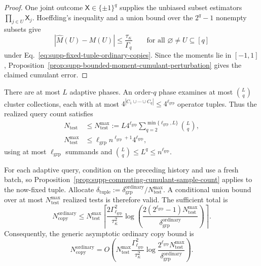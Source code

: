 \documentclass[
  aps,
  prx,
  reprint,
  superscriptaddress,
  amsmath,
  amssymb,
  nofootinbib,
  longbibliography
]{revtex4-2}
\begin{document}
\begin{proof}
One joint outcome $\mathsf X\in\{\pm1\}^q$ supplies the unbiased subset
estimators $\prod_{j\in U}\mathsf X_j$.  Hoeffding's inequality
\cite{Hoeffding1963} and a union bound over the $2^q-1$ nonempty subsets give
\begin{equation}
|\widehat M(U)-M(U)|
\le
\frac{\tau_\kappa}{\Gamma_q}
\qquad
\text{for all }\varnothing\ne U\subseteq[q]
\end{equation}
under Eq.~\eqref{eq:supp-fixed-tuple-ordinary-copies}.  Since the moments lie
in $[-1,1]$,
Proposition~\ref{prop:supp-bounded-moment-cumulant-perturbation} gives the
claimed cumulant error.
\end{proof}

There are at most $L$ adaptive phases.  An order-$q$ phase examines at most
$\binom Lq$ cluster collections, each with at most
$4^{|C_1\cup\cdots\cup C_q|}\le4^{\ell_{\mathrm{grp}}}$ operator tuples.
Thus the realized query count satisfies
\begin{align}
N_{\mathrm{test}}
&\le N_{\mathrm{test}}^{\max}
:=
L4^{\ell_{\mathrm{grp}}}
\sum_{q=2}^{\min\{\ell_{\mathrm{grp}},L\}}\binom{L}{q},
\label{eq:supp-number-adaptive-cumulant-tests}\\
N_{\mathrm{test}}^{\max}
&\le
\ell_{\mathrm{grp}}n^{\ell_{\mathrm{grp}}+1}4^{\ell_{\mathrm{grp}}},
\label{eq:supp-number-adaptive-cumulant-tests-simplified}
\end{align}
using at most $\ell_{\mathrm{grp}}$ summands and
$\binom Lq\le L^q\le n^{\ell_{\mathrm{grp}}}$.

For each adaptive query, condition on the preceding history and use a fresh
batch, so Proposition~\ref{prop:supp-commuting-cumulant-sample-count}
applies to the now-fixed tuple.  Allocate
$\delta_{\mathrm{tuple}}:=
\delta_{\mathrm{grp}}^{\mathrm{ordinary}}/N_{\mathrm{test}}^{\max}$.
A conditional union bound over at most
$N_{\mathrm{test}}^{\max}$ realized tests is therefore valid.  The
sufficient total is
\begin{equation}
N_{\mathrm{copy}}^{\mathrm{ordinary}}
\le
N_{\mathrm{test}}^{\max}
\left\lceil
\frac{2\Gamma_{\ell_{\mathrm{grp}}}^2}{\tau_\kappa^2}
\log\!\left(
\frac{
2(2^{\ell_{\mathrm{grp}}}-1)
N_{\mathrm{test}}^{\max}
}{\delta_{\mathrm{grp}}^{\mathrm{ordinary}}}
\right)
\right\rceil.
\end{equation}
Consequently, the generic asymptotic ordinary copy bound is
\begin{equation}
N_{\mathrm{copy}}^{\mathrm{ordinary}}
=
O\!\left(
N_{\mathrm{test}}^{\max}
\frac{\Gamma_{\ell_{\mathrm{grp}}}^2}{\tau_\kappa^2}
\log\frac{
2^{\ell_{\mathrm{grp}}}N_{\mathrm{test}}^{\max}
}{\delta_{\mathrm{grp}}^{\mathrm{ordinary}}}
\right).
\label{eq:supp-ordinary-grouping-generic-copies}
\end{equation}
\end{document}
